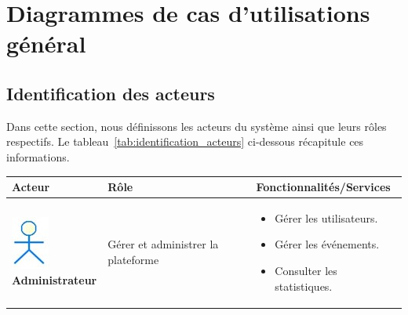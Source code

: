 \section{Diagrammes de cas d'utilisations général}

\subsection{Identification des acteurs}

Dans cette section, nous définissons les acteurs du système ainsi que leurs rôles respectifs. Le tableau~\ref{tab:identification_acteurs} ci-dessous récapitule ces informations.

\begin{longtable}{|p{4cm}|p{5cm}|p{6cm}|}
\hline
\textbf{Acteur} & \textbf{Rôle} & \textbf{Fonctionnalités/Services} \\ 
\hline
\parbox[c][3.5cm][c]{\linewidth}{\centering
\includegraphics[width=0.3\linewidth]{projet/images/diagramme de sequance/acteur.jpg} \\[0.2cm] \textbf{Administrateur}
} & 
Gérer et administrer la plateforme & 
\begin{itemize}[leftmargin=0.5cm]
    \item Gérer les utilisateurs.
    \item Gérer les événements.
    \item Consulter les statistiques.
\end{itemize} \\ 
\hline


\end{longtable}

